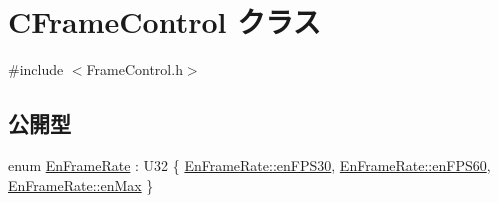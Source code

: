 \hypertarget{class_c_frame_control}{}\section{C\+Frame\+Control クラス}
\label{class_c_frame_control}


{\ttfamily \#include $<$Frame\+Control.\+h$>$}

\subsection*{公開型}
\begin{DoxyCompactItemize}
\item 
enum \hyperlink{class_c_frame_control_a4d5daea7d8ab2b21db46d58602fb92c5}{En\+Frame\+Rate} \+: U32 \{ \hyperlink{class_c_frame_control_a4d5daea7d8ab2b21db46d58602fb92c5a3abae29b23303e771001fc089ec15357}{En\+Frame\+Rate\+::en\+F\+P\+S30}, 
\hyperlink{class_c_frame_control_a4d5daea7d8ab2b21db46d58602fb92c5a0987a92fbe4240e0180dd6f0fac52ab8}{En\+Frame\+Rate\+::en\+F\+P\+S60}, 
\hyperlink{class_c_frame_control_a4d5daea7d8ab2b21db46d58602fb92c5a079bb6413c37006b9fdc56add34e517b}{En\+Frame\+Rate\+::en\+Max}
 \}
\end{DoxyCompactItemize}
